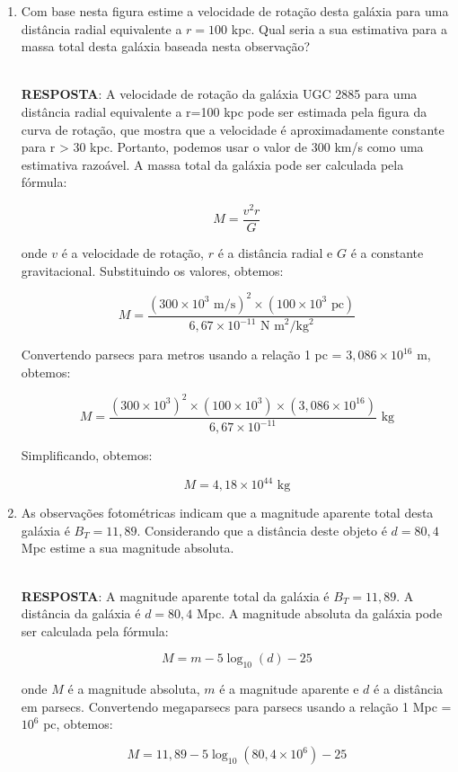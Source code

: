 \documentclass[a4paper,12pt]{article}
\begin{document}
\begin{enumerate}
\begin{enumerate}
\item Com base nesta figura estime a velocidade de rotação desta 
galáxia para uma distância radial equivalente a $r=100$ kpc. Qual 
seria a sua estimativa para a massa total desta galáxia baseada 
nesta observação?

\noindent\hrulefill\\\textbf{RESPOSTA}: A velocidade de rotação da galáxia UGC 2885 para uma distância radial equivalente a r=100 kpc pode ser estimada pela figura da curva de rotação, que mostra que a velocidade é aproximadamente constante para r > 30 kpc. Portanto, podemos usar o valor de 300 km/s como uma estimativa razoável. A massa total da galáxia pode ser calculada pela fórmula:

$$M = \frac{v^2 r}{G}$$

onde $v$ é a velocidade de rotação, $r$ é a distância radial e $G$ é a constante gravitacional. Substituindo os valores, obtemos:

$$M = \frac{(300 \times 10^3 \text{ m/s})^2 \times (100 \times 10^3 \text{ pc})}{6,67 \times 10^{-11} \text{ N m}^2/\text{kg}^2}$$

Convertendo parsecs para metros usando a relação 1 pc = $3,086 \times 10^{16}$ m, obtemos:

$$M = \frac{(300 \times 10^3)^2 \times (100 \times 10^3) \times (3,086 \times 10^{16})}{6,67 \times 10^{-11}} \text{ kg}$$

Simplificando, obtemos:

$$M = 4,18 \times 10^{44} \text{ kg}$$

\noindent\hrulefill

\item As observações fotométricas indicam que a magnitude aparente
total desta galáxia é $B_T=11,89$. Considerando que a distância 
deste objeto é $d=80,4$ Mpc estime a sua magnitude absoluta.

\noindent\hrulefill\\\textbf{RESPOSTA}: A magnitude aparente total da galáxia é $B_T = 11,89$. A distância da galáxia é $d = 80,4$ Mpc. A magnitude absoluta da galáxia pode ser calculada pela fórmula:

$$M = m - 5\log_{10}(d) - 25$$

onde $M$ é a magnitude absoluta, $m$ é a magnitude aparente e $d$ é a distância em parsecs. Convertendo megaparsecs para parsecs usando a relação 1 Mpc = $10^6$ pc, obtemos:

$$M = 11,89 - 5\log_{10}(80,4 \times 10^6) - 25$$


\end{enumerate}
\end{enumerate}
\end{document}

